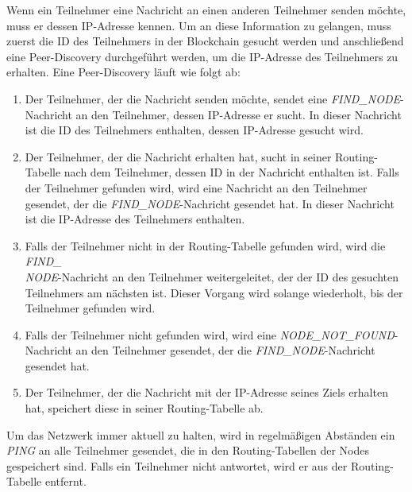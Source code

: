 Wenn ein Teilnehmer eine Nachricht an einen anderen Teilnehmer senden möchte, muss er dessen IP-Adresse kennen. Um an diese Information zu gelangen, muss zuerst die ID des Teilnehmers in der Blockchain gesucht werden und anschließend eine Peer-Discovery durchgeführt werden, um die IP-Adresse des Teilnehmers zu erhalten. Eine Peer-Discovery läuft wie folgt ab:
\begin{enumerate}
    \item Der Teilnehmer, der die Nachricht senden möchte, sendet eine \textit{FIND\_NODE}-Nachricht an den Teilnehmer, dessen IP-Adresse er sucht. In dieser Nachricht ist die ID des Teilnehmers enthalten, dessen IP-Adresse gesucht wird.
    \item Der Teilnehmer, der die Nachricht erhalten hat, sucht in seiner Routing-Tabelle nach dem Teilnehmer, dessen ID in der Nachricht enthalten ist. Falls der Teilnehmer gefunden wird, wird eine Nachricht an den Teilnehmer gesendet, der die \textit{FIND\_NODE}-Nachricht gesendet hat. In dieser Nachricht ist die IP-Adresse des Teilnehmers enthalten.
    \item Falls der Teilnehmer nicht in der Routing-Tabelle gefunden wird, wird die \textit{FIND\_\\NODE}-Nachricht an den Teilnehmer weitergeleitet, der der ID des gesuchten Teilnehmers am nächsten ist. Dieser Vorgang wird solange wiederholt, bis der Teilnehmer gefunden wird.
    \item Falls der Teilnehmer nicht gefunden wird, wird eine \textit{NODE\_NOT\_FOUND}-\\Nachricht an den Teilnehmer gesendet, der die \textit{FIND\_NODE}-Nachricht gesendet hat.
    \item Der Teilnehmer, der die Nachricht mit der IP-Adresse seines Ziels erhalten hat, speichert diese in seiner Routing-Tabelle ab.
\end{enumerate}

\noindent Um das Netzwerk immer aktuell zu halten, wird in regelmäßigen Abständen ein \textit{PING} an alle Teilnehmer gesendet, die in den Routing-Tabellen der Nodes gespeichert sind. Falls ein Teilnehmer nicht antwortet, wird er aus der Routing-Tabelle entfernt.
